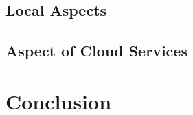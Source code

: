 \documentclass[a4paper, 11pt]{article}
\begin{document}
	\subsection{Local Aspects}
	
	\subsection{Aspect of Cloud Services}
	
	\section{Conclusion}
	
%	
%
%	
%	
%	
\end{document}
